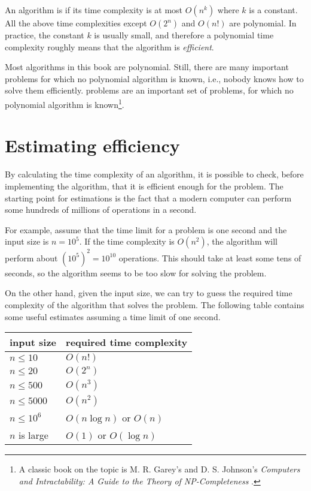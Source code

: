An algorithm is 
if its time complexity is at most $O(n^k)$
where $k$ is a constant.
All the above time complexities except
$O(2^n)$ and $O(n!)$ are polynomial.
In practice, the constant $k$ is usually small,
and therefore a polynomial time complexity
roughly means that the algorithm is \emph{efficient}.


Most algorithms in this book are polynomial.
Still, there are many important problems for which
no polynomial algorithm is known, i.e.,
nobody knows how to solve them efficiently.
 problems are an important set
of problems, for which no polynomial algorithm
is known\footnote{A classic book on the topic is
M. R. Garey's and D. S. Johnson's
\emph{Computers and Intractability: A Guide to the Theory
of NP-Completeness} \cite{gar79}.}.

\section{Estimating efficiency}

By calculating the time complexity of an algorithm,
it is possible to check, before
implementing the algorithm, that it is
efficient enough for the problem.
The starting point for estimations is the fact that
a modern computer can perform some hundreds of
millions of operations in a second.

For example, assume that the time limit for
a problem is one second and the input size is $n=10^5$.
If the time complexity is $O(n^2)$,
the algorithm will perform about $(10^5)^2=10^{10}$ operations.
This should take at least some tens of seconds,
so the algorithm seems to be too slow for solving the problem.

On the other hand, given the input size,
we can try to guess
the required time complexity of the algorithm
that solves the problem.
The following table contains some useful estimates
assuming a time limit of one second.

\begin{center}
\begin{tabular}{ll}
input size & required time complexity \\
\hline
$n \le 10$ & $O(n!)$ \\
$n \le 20$ & $O(2^n)$ \\
$n \le 500$ & $O(n^3)$ \\
$n \le 5000$ & $O(n^2)$ \\
$n \le 10^6$ & $O(n \log n)$ or $O(n)$ \\
$n$ is large & $O(1)$ or $O(\log n)$ \\
\end{tabular}
\end{center}

